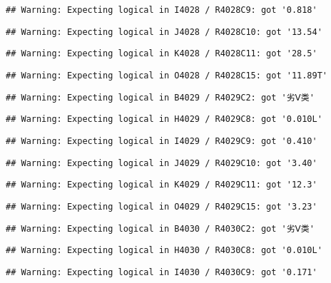 \documentclass[
]{article}
\begin{document}
\begin{verbatim}
## Warning: Expecting logical in I4028 / R4028C9: got '0.818'
\end{verbatim}

\begin{verbatim}
## Warning: Expecting logical in J4028 / R4028C10: got '13.54'
\end{verbatim}

\begin{verbatim}
## Warning: Expecting logical in K4028 / R4028C11: got '28.5'
\end{verbatim}

\begin{verbatim}
## Warning: Expecting logical in O4028 / R4028C15: got '11.89T'
\end{verbatim}

\begin{verbatim}
## Warning: Expecting logical in B4029 / R4029C2: got '劣Ⅴ类'
\end{verbatim}

\begin{verbatim}
## Warning: Expecting logical in H4029 / R4029C8: got '0.010L'
\end{verbatim}

\begin{verbatim}
## Warning: Expecting logical in I4029 / R4029C9: got '0.410'
\end{verbatim}

\begin{verbatim}
## Warning: Expecting logical in J4029 / R4029C10: got '3.40'
\end{verbatim}

\begin{verbatim}
## Warning: Expecting logical in K4029 / R4029C11: got '12.3'
\end{verbatim}

\begin{verbatim}
## Warning: Expecting logical in O4029 / R4029C15: got '3.23'
\end{verbatim}

\begin{verbatim}
## Warning: Expecting logical in B4030 / R4030C2: got '劣Ⅴ类'
\end{verbatim}

\begin{verbatim}
## Warning: Expecting logical in H4030 / R4030C8: got '0.010L'
\end{verbatim}

\begin{verbatim}
## Warning: Expecting logical in I4030 / R4030C9: got '0.171'
\end{verbatim}
\end{document}
